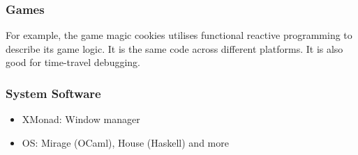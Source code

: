\documentclass[a4paper]{article}
\theoremstyle{plain}
\theoremstyle{definition}
\theoremstyle{remark}
\begin{document}
\subsubsection{Games}
For example, the game magic cookies utilises functional reactive programming to describe its game logic. It is the same code across different platforms. It is also good for time-travel debugging.
\subsubsection{System Software}
\begin{itemize}
	\item XMonad: Window manager
	\item OS: Mirage (OCaml), House (Haskell) and more
\end{itemize}
\end{document}
